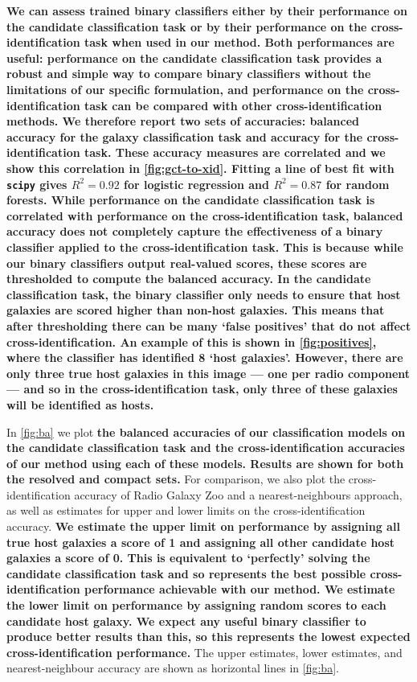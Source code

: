\documentclass[fleqn,usenatbib,usedcolumn]{mnras}
\newcommand{\edited}[1]{{\bf {#1}}}
\begin{document}
    \edited{We can assess trained binary classifiers either by their performance on
    the candidate classification task or by their performance on the
    cross-identification task when used in our method. Both performances are
    useful: performance on the candidate classification task provides a robust
    and simple way to compare binary classifiers without the limitations of
    our specific formulation, and performance on the cross-identification task
    can be compared with other cross-identification methods. We therefore
    report two sets of accuracies: balanced accuracy for the galaxy
    classification task and accuracy for the cross-identification task. These
    accuracy measures are correlated and we show this correlation in
    \autoref{fig:gct-to-xid}. Fitting a line of best fit with \texttt{scipy}
    gives $R^2 = 0.92$ for logistic regression and $R^2 = 0.87$ for random
    forests. While performance on the candidate classification task is correlated
    with performance on the cross-identification task, balanced accuracy does
    not completely capture the effectiveness of a binary classifier applied to
    the cross-identification task. \edited{This is because while our binary
    classifiers output real-valued scores, these scores are thresholded to
    compute the balanced accuracy}. In the candidate classification
    task, the binary classifier only needs to ensure that host galaxies are
    \edited{scored higher} than non-host galaxies. This means
    \edited{that after thresholding} there can be
    many `false positives' that do not affect cross-identification. An example
    of this is shown in \autoref{fig:positives}, where the classifier has
    identified 8 `host galaxies'. However, there are only three true host
    galaxies in this image --- one per radio component --- and so in the
    cross-identification task, only three of these galaxies will be identified
    as hosts.}

    In \autoref{fig:ba} we plot \edited{the balanced accuracies of our classification models
    on the candidate classification task and the cross-identification
    accuracies of our method using each of these models. Results are shown for both
    the resolved and compact sets.} For comparison, we also plot the cross-identification accuracy of Radio Galaxy
    Zoo and a nearest-neighbours approach, as well as estimates for upper and
    lower limits on the cross-identification accuracy. \edited{We estimate the upper limit on performance by assigning all
    true host galaxies a score of 1 and
    assigning all other candidate host galaxies a score of 0. This
    is equivalent to `perfectly' solving the candidate classification task and so
    represents the best possible cross-identification performance achievable
    with our method. We estimate the lower limit on performance by \edited{
    assigning random scores to each candidate host galaxy}. We expect any
    useful binary classifier to produce better
    results than this, so this represents the lowest expected
    cross-identification performance.} The upper estimates, lower estimates,
    and nearest-neighbour accuracy are shown as horizontal lines in
    \autoref{fig:ba}.
\end{document}
